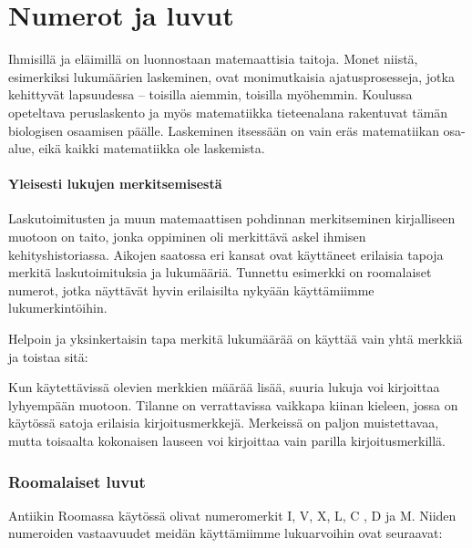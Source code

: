 \chapter{Numerot ja luvut}

Ihmisillä ja eläimillä on luonnostaan matemaattisia taitoja. Monet niistä, esimerkiksi lukumäärien laskeminen, ovat monimutkaisia ajatusprosesseja, jotka kehittyvät lapsuudessa – toisilla aiemmin, toisilla myöhemmin. Koulussa opeteltava peruslaskento ja myös matematiikka tieteenalana rakentuvat tämän biologisen osaamisen päälle. Laskeminen itsessään on vain eräs matematiikan osa-alue, eikä kaikki matematiikka ole laskemista.


\subsubsection*{Yleisesti lukujen merkitsemisestä}

Laskutoimitusten ja muun matemaattisen pohdinnan merkitseminen kirjalliseen muotoon on taito, jonka oppiminen oli merkittävä askel ihmisen kehityshistoriassa. Aikojen saatossa eri kansat ovat käyttäneet erilaisia tapoja merkitä laskutoimituksia ja lukumääriä. Tunnettu esimerkki on roomalaiset numerot, jotka näyttävät hyvin erilaisilta nykyään käyttämiimme lukumerkintöihin.

Helpoin ja yksinkertaisin tapa merkitä lukumäärää on käyttää vain yhtä merkkiä ja toistaa sitä:


Kun käytettävissä olevien merkkien määrää lisää, suuria lukuja voi kirjoittaa lyhyempään muotoon. Tilanne on verrattavissa vaikkapa kiinan kieleen, jossa on käytössä satoja erilaisia kirjoitusmerkkejä. Merkeissä on paljon muistettavaa, mutta toisaalta kokonaisen lauseen voi kirjoittaa vain parilla kirjoitusmerkillä.




\subsection*{Roomalaiset luvut}
Antiikin Roomassa käytössä olivat numeromerkit I, V, X, L, C , D ja M. Niiden numeroiden vastaavuudet meidän käyttämiimme lukuarvoihin ovat seuraavat:


